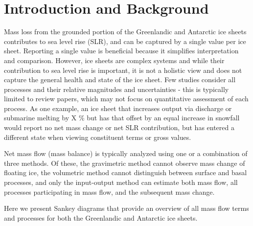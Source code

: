 \documentclass[jog]{igs}
\begin{document}
\section{Introduction and Background}

Mass loss from the grounded portion of the Greenlandic and Antarctic ice sheets contributes to sea level rise (SLR), and can be captured by a single value per ice sheet. Reporting a single value is beneficial because it simplifies interpretation and comparison. However, ice sheets are complex systems and while their contribution to sea level rise is important, it is not a holistic view and does not capture the general health and state of the ice sheet. Few studies consider all processes and their relative magnitudes and uncertainties - this is typically limited to review papers, which may not focus on quantitative assessment of each process. As one example, an ice sheet that increases output via discharge or submarine melting by X \% but has that offset by an equal increase in snowfall would report no net mass change or net SLR contribution, but has entered a different state when viewing constituent terms or gross values.

Net mass flow (mass balance) is typically analyzed using one or a combination of three methods. Of these, the gravimetric method cannot observe mass change of floating ice, the volumetric method cannot distinguish between surface and basal processes, and only the input-output method can estimate both mass flow, all processes participating in mass flow, and the subsequent mass change.

Here we present Sankey diagrams that provide an overview of all mass flow terms and processes for both the Greenlandic and Antarctic ice sheets.

\end{document}
